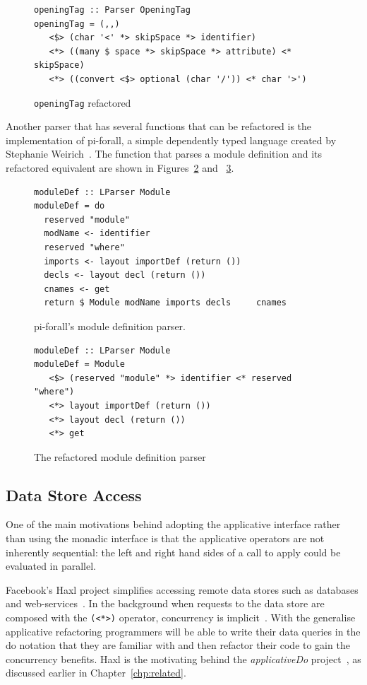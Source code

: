 \begin{figure}[t]
\begin{lstlisting}
openingTag :: Parser OpeningTag
openingTag = (,,) 
   <$> (char '<' *> skipSpace *> identifier) 
   <*> ((many $ space *> skipSpace *> attribute) <* skipSpace) 
   <*> ((convert <$> optional (char '/')) <* char '>')
\end{lstlisting}
\caption{\texttt{openingTag} refactored}
\label{openingTag_ref}
\end{figure}

Another parser that has several functions that can be refactored is the implementation of pi-forall, a simple dependently typed language created by Stephanie Weirich~\citep{piForall}. The function that parses a module definition and its refactored equivalent are shown in Figures~\ref{piParse} and ~\ref{piParse_ref}.

\begin{figure}[t]
\begin{lstlisting}
moduleDef :: LParser Module
moduleDef = do
  reserved "module"
  modName <- identifier
  reserved "where"
  imports <- layout importDef (return ())
  decls <- layout decl (return ())
  cnames <- get
  return $ Module modName imports decls     cnames
\end{lstlisting}
\caption{pi-forall's module definition parser.}
\label{piParse}
\end{figure}

\begin{figure}[t]
\begin{lstlisting}
moduleDef :: LParser Module
moduleDef = Module
   <$> (reserved "module" *> identifier <* reserved "where") 
   <*> layout importDef (return ()) 
   <*> layout decl (return ()) 
   <*> get
\end{lstlisting}
\caption{The refactored module definition parser}
\label{piParse_ref}
\end{figure}



\subsection{Data Store Access}

One of the main motivations behind adopting the applicative interface rather than using the monadic interface is that the applicative operators are not inherently sequential: the left and right hand sides of a call to apply could be evaluated in parallel. 

Facebook's Haxl project simplifies accessing remote data stores such as databases and web-services~\citep{haxl}. In the background when requests to the data store are composed with the \texttt{(<*>)} operator, concurrency is implicit~\citep{haxl}. With the generalise applicative refactoring programmers will be able to write their data queries in the do notation that they are familiar with and then refactor their code to gain the concurrency benefits. Haxl is the motivating behind the \textit{applicativeDo} project~\citep{applicativeDo}, as discussed earlier in Chapter~\ref{chp:related}.


